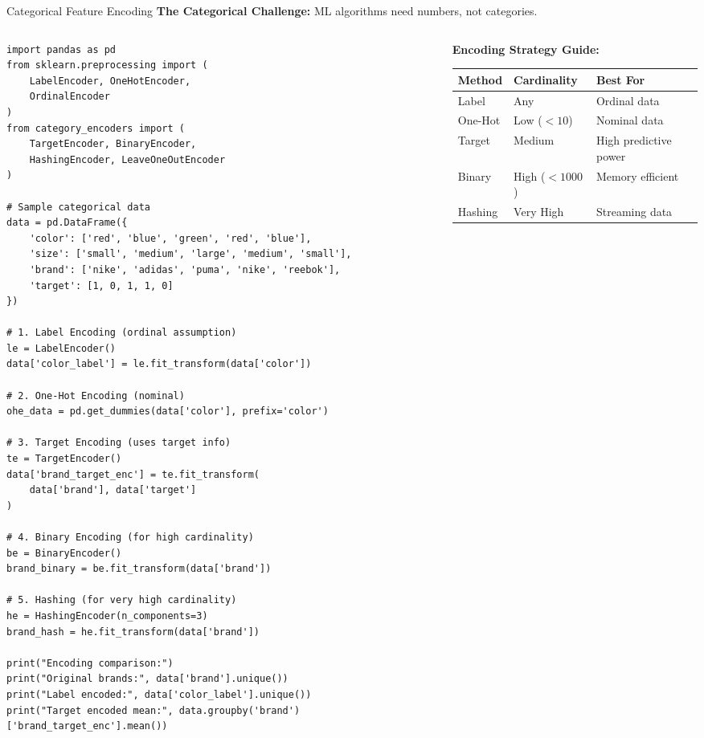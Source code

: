 \documentclass[aspectratio=169,11pt]{beamer}
\begin{document}
\begin{frame}[fragile]{Categorical Feature Encoding}
\textbf{The Categorical Challenge:} ML algorithms need numbers, not categories.

\begin{columns}
\begin{column}{0.55\textwidth}
\begin{lstlisting}
import pandas as pd
from sklearn.preprocessing import (
    LabelEncoder, OneHotEncoder, 
    OrdinalEncoder
)
from category_encoders import (
    TargetEncoder, BinaryEncoder,
    HashingEncoder, LeaveOneOutEncoder
)

# Sample categorical data
data = pd.DataFrame({
    'color': ['red', 'blue', 'green', 'red', 'blue'],
    'size': ['small', 'medium', 'large', 'medium', 'small'],
    'brand': ['nike', 'adidas', 'puma', 'nike', 'reebok'],
    'target': [1, 0, 1, 1, 0]
})

# 1. Label Encoding (ordinal assumption)
le = LabelEncoder()
data['color_label'] = le.fit_transform(data['color'])

# 2. One-Hot Encoding (nominal)
ohe_data = pd.get_dummies(data['color'], prefix='color')

# 3. Target Encoding (uses target info)
te = TargetEncoder()
data['brand_target_enc'] = te.fit_transform(
    data['brand'], data['target']
)

# 4. Binary Encoding (for high cardinality)
be = BinaryEncoder()
brand_binary = be.fit_transform(data['brand'])

# 5. Hashing (for very high cardinality)
he = HashingEncoder(n_components=3)
brand_hash = he.fit_transform(data['brand'])

print("Encoding comparison:")
print("Original brands:", data['brand'].unique())
print("Label encoded:", data['color_label'].unique())
print("Target encoded mean:", data.groupby('brand')['brand_target_enc'].mean())
\end{lstlisting}
\end{column}
\begin{column}{0.45\textwidth}
\textbf{Encoding Strategy Guide:}

\begin{table}
\centering
\tiny
\begin{tabular}{p{2cm}p{1.5cm}p{1.5cm}}
\toprule
\textbf{Method} & \textbf{Cardinality} & \textbf{Best For} \\
\midrule
Label & Any & Ordinal data \\
One-Hot & Low ($<10$) & Nominal data \\
Target & Medium & High predictive power \\
Binary & High ($<1000$) & Memory efficient \\
Hashing & Very High & Streaming data \\
\bottomrule
\end{tabular}
\end{table}


\end{column}
\end{columns}
\end{frame}
\end{document}
